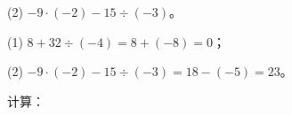 \begin{enhancedline}
(2) \; $-9 \cdot (-2) - 15 \div (-3)$。

\jie (1) \; $8 + 32 \div (-4) = 8 + (-8) = 0$；

(2) \; $-9 \cdot (-2) - 15 \div (-3) = 18 - (-5) = 23$。


\lianxi

计算：

\begin{xiaotis}
\setcounter{cntxiaoti}{0}




\end{xiaotis}

\end{enhancedline}
